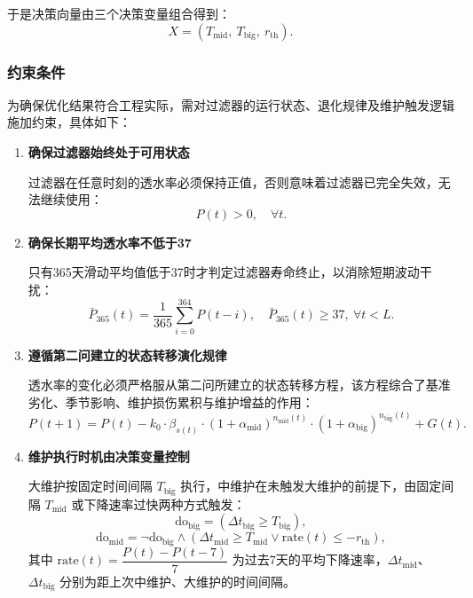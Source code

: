 \documentclass[withoutpreface,bwprint]{cumcmthesis}
\renewcommand{\bfseries}{\CJKfamily{bfsong}}
\begin{document}
于是决策向量由三个决策变量组合得到：
\begin{equation}
	X = (T_{\text{mid}},\ T_{\text{big}},\ r_{\text{th}}).
\end{equation}


\subsubsection{约束条件}

为确保优化结果符合工程实际，需对过滤器的运行状态、退化规律及维护触发逻辑施加约束，具体如下：

\begin{enumerate}[label=\bfseries\arabic*.]
	\item \textbf{确保过滤器始终处于可用状态}
	
	过滤器在任意时刻的透水率必须保持正值，否则意味着过滤器已完全失效，无法继续使用：
	\begin{equation}
		P(t) > 0, \quad \forall t.
	\end{equation}
	
	\item \textbf{确保长期平均透水率不低于37}
	
	只有365天滑动平均值低于37时才判定过滤器寿命终止，以消除短期波动干扰：
	\begin{equation}
		\bar{P}_{365}(t) = \frac{1}{365}\sum_{i=0}^{364} P(t-i), \quad \bar{P}_{365}(t) \geq 37,\ \forall t < L.
	\end{equation}
	
	\item \textbf{遵循第二问建立的状态转移演化规律}
	
	透水率的变化必须严格服从第二问所建立的状态转移方程，该方程综合了基准劣化、季节影响、维护损伤累积与维护增益的作用：
	\begin{equation}
		P(t+1) = P(t) - k_0 \cdot \beta_{s(t)} \cdot (1+\alpha_{\text{mid}})^{n_{\text{mid}}(t)} \cdot (1+\alpha_{\text{big}})^{n_{\text{big}}(t)} + G(t).
	\end{equation}
	
	\item \textbf{维护执行时机由决策变量控制}
	
	大维护按固定时间间隔 $T_{\text{big}}$ 执行，中维护在未触发大维护的前提下，由固定间隔 $T_{\text{mid}}$ 或下降速率过快两种方式触发：
	\begin{equation}
		\text{do}_{\text{big}} = \left( \Delta t_{\text{big}} \geq T_{\text{big}} \right),
	\end{equation}
	\begin{equation}
		\text{do}_{\text{mid}} = \neg \text{do}_{\text{big}} \land \left( \Delta t_{\text{mid}} \geq T_{\text{mid}} \lor \text{rate}(t) \leq -r_{\text{th}} \right),
	\end{equation}
	其中 $\text{rate}(t) = \dfrac{P(t) - P(t-7)}{7}$ 为过去7天的平均下降速率，$\Delta t_{\text{mid}}$、$\Delta t_{\text{big}}$ 分别为距上次中维护、大维护的时间间隔。
\end{enumerate}
\end{document}
